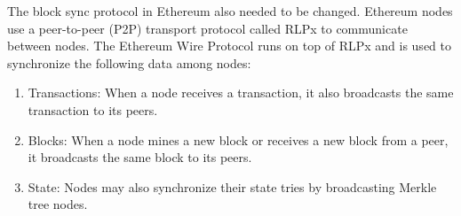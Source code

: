 \documentclass[12pt]{article}
\newcounter{protocol}
\begin{document}
The block sync protocol in Ethereum also needed to be changed. Ethereum nodes use a peer-to-peer (P2P) transport protocol called RLPx to communicate between nodes. The Ethereum Wire Protocol runs on top of RLPx and is used to synchronize the following data among nodes:
\begin{enumerate}
  \item Transactions: When a node receives a transaction, it also broadcasts the same transaction to its peers.
  \item Blocks: When a node mines a new block or receives a new block from a peer, it broadcasts the same block to its peers.
  \item State: Nodes may also synchronize their state tries by broadcasting Merkle tree nodes.
\end{enumerate}
\end{document}
